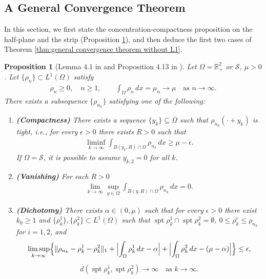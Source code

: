 \documentclass[11pt,letterpaper]{amsart}
\newtheorem{prop}[thm]{Proposition}
\theoremstyle{definition}
\theoremstyle{remark}
\renewcommand{\S}{\mathcal{S}}
\newcommand{\R}{\mathbb{R}}
\renewcommand{\O}{\Omega}
\newcommand{\spt}{\operatorname{spt}}
\numberwithin{equation}{section}
\begin{document}
\rightline{$\Box$}


\subsection{A General Convergence Theorem} \label{sec:general convergence theorem for half plane and strip}

In this section, we first state the concentration-compactness proposition on the half-plane and the strip (Proposition \ref{prop:concentration-compactness lemma}), and then deduce the first two cases of Theorem \ref{thm:general convergence theorem without L1}.

\begin{prop}[Lemma 4.1 in \cite{abe2022stability} and Proposition 4.13 in \cite{Dong2026StabilityOV}]\label{prop:concentration-compactness lemma}
Let $\O=\R^2_+$ or $\S$, $\mu>0$. Let \(\{\rho_n\}\subset L^1(\O)\) satisfy
\begin{align*}
\rho_n\ge 0,\quad n\ge 1,\qquad \int_{\O}\rho_n\,dx = \mu_n \to \mu \quad\text{as } n\to\infty .
\end{align*}
There exists a subsequence \(\{\rho_{n_k}\}\) satisfying one of the following:
\begin{enumerate}
    \item \textbf{(Compactness)} There exists a sequence \(\{y_k\}\subseteq\overline{\O}\) such that \(\rho_{n_k}(\cdot+y_k)\) is tight, i.e., for every \(\epsilon>0\) there exists \(R>0\) such that
    \begin{align*}
        \liminf_{k\to\infty}\int_{B(y_k,R)\cap \O}\rho_{n_k}\,dx \ge \mu-\epsilon.
    \end{align*}
    If $\O=\S$, it is possible to assume $y_{k,2}=0$ for all $k$.
    \item \textbf{(Vanishing)} For each \(R>0\)
    \begin{align*}
        \lim_{k\to\infty}\sup_{y\in \O}\int_{B(y,R)\cap \O}\rho_{n_k}\,dx = 0 .
    \end{align*}
    \item \textbf{(Dichotomy)} There exists \(\alpha\in(0,\mu)\) such that for every \(\epsilon>0\) there exist \(k_0\ge 1\) and \(\{\rho_k^1\},\{\rho_k^2\}\subset L^1(\O)\) such that \(\spt\rho_k^1\cap\spt\rho_k^2=\emptyset\), \(0\le\rho_k^i\le\rho_{n_k}\) for \(i=1,2\), and
    \begin{align*}
        \limsup_{k\to\infty}\Bigl\{\|\rho_{n_k}-\rho_k^1-\rho_k^2\|_{1}
        + \Bigl|\int_{\O}\rho_k^1\,dx-\alpha\Bigr|
        + \Bigl|\int_{\O}\rho_k^2\,dx-(\mu-\alpha)\Bigr|\Bigr\} \le \epsilon ,
    \end{align*}
    \begin{align*}
    d(\spt\rho_k^1,\spt\rho_k^2) \to \infty \quad\text{as } k\to\infty .
    \end{align*}
\end{enumerate}
\end{prop}
\end{document}
